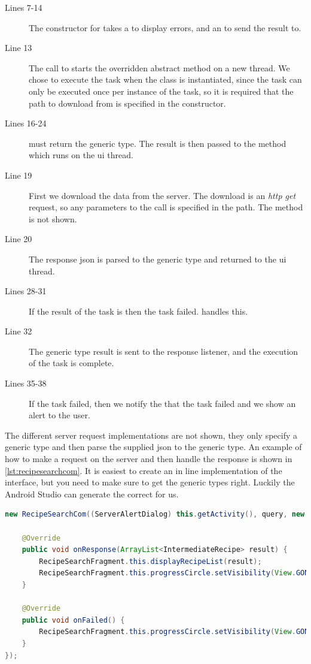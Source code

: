 \begin{description}
\item[Lines 7-14] The constructor for  takes a  to display errors, and an  to send the result to.
\item[Line 13] The call to  starts the overridden abstract method \linebreak{} on a new thread. We chose to execute the task when the class is instantiated, since the task can only be executed once per instance of the task, so it is required that the path to download from is specified in the constructor.
\item[Lines 16-24]  must return the generic type. The result is then passed to the method  which runs on the \ac{ui} thread.
\item[Line 19] First we download the data from the server. The download is an \textit{http get} request, so any parameters to the call is specified in the path. The  method is not shown.
\item[Line 20] The response \ac{json} is parsed to the generic type and returned to the \ac{ui} thread.
\item[Lines 28-31] If the result of the task is  then the task failed.  handles this.
\item[Line 32] The generic type result is sent to the response listener, and the execution of the task is complete.
\item[Lines 35-38] If the task failed, then we notify the  that the task failed and we show an alert to the user.
\end{description}
The different server request implementations are not shown, they only specify a generic type and then parse the supplied \ac{json} to the generic type. An example of how to make a request on the server and then handle the response is shown in \autoref{lst:recipesearchcom}. It is easiest to create an in line implementation of the  interface, but you need to make sure to get the generic types right. Luckily the Android Studio can generate the correct  for us.

\begin{lstlisting}[language=java, label=lst:recipesearchcom, caption={Search for recipes by text.}]
new RecipeSearchCom((ServerAlertDialog) this.getActivity(), query, new OnResponseListener<ArrayList<IntermediateRecipe>>() {
    
    @Override
    public void onResponse(ArrayList<IntermediateRecipe> result) {
        RecipeSearchFragment.this.displayRecipeList(result);
        RecipeSearchFragment.this.progressCircle.setVisibility(View.GONE);
    }

    @Override
    public void onFailed() {
        RecipeSearchFragment.this.progressCircle.setVisibility(View.GONE);
    }
});
\end{lstlisting}

